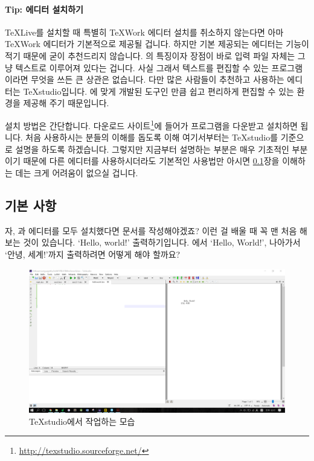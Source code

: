 \paragraph{Tip: 에디터 설치하기}
\TeX Live를 설치할 때 특별히 TeXWork 에디터 설치를 취소하지 않는다면 아마 TeXWork 에디터가 기본적으로 제공될 겁니다. 하지만 기본 제공되는 에디터는 기능이 적기 때문에 굳이 추천드리지 않습니다. \lt 의 특징이자 장점이 바로 입력 파일 자체는 그냥 텍스트로 이루어져 있다는 겁니다. 사실 그래서 텍스트를 편집할 수 있는 프로그램이라면 무엇을 쓰든 큰 상관은 없습니다. 다만 많은 사람들이 추천하고 사용하는 에디터는 TeXstudio입니다. \lt 에 맞게 개발된 도구인 만큼 쉽고 편리하게 편집할 수 있는 환경을 제공해 주기 때문입니다.

설치 방법은 간단합니다. 다운로드 사이트\footnote{\url{http://texstudio.sourceforge.net/}}에 들어가 프로그램을 다운받고 설치하면 됩니다. 처음 사용하시는 분들의 이해를 돕도록 이해 여기서부터는 TeXstudio를 기준으로 설명을 하도록 하겠습니다. 그렇지만 지금부터 설명하는 부분은 매우 기초적인 부분이기 때문에 다른 \lt 에디터를 사용하시더라도 기본적인 사용법만 아시면 \ref{sec:basics}장을 이해하는 데는 크게 어려움이 없으실 겁니다.

\subsection{기본 사항}
\label{sec:basics}
자, \lt 과 에디터를 모두 설치했다면 문서를 작성해야겠죠? 이런 걸 배울 때 꼭 맨 처음 해보는 것이 있습니다. `Hello, world!' 출력하기입니다. \lt 에서 `Hello, World!', 나아가서 `안녕, 세계!'까지 출력하려면 어떻게 해야 할까요?

\begin{figure}[h]
	\includegraphics[width=\textwidth]{figures/nhelloworld.png}
	\caption{TeXstudio에서 작업하는 모습\label{fig:nhelloworld}}
\end{figure}

